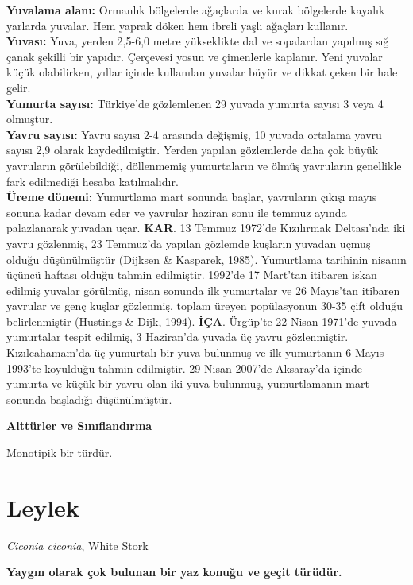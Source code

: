 \documentclass[
  a4paper,
  DIV=11,
  numbers=noendperiod]{scrreprt}
\begin{document}
\textbf{Yuvalama alanı:} Ormanlık bölgelerde ağaçlarda ve kurak
bölgelerde kayalık yarlarda yuvalar. Hem yaprak döken hem ibreli yaşlı
ağaçları kullanır.\\
\textbf{Yuvası:} Yuva, yerden 2,5-6,0 metre yükseklikte dal ve
sopalardan yapılmış sığ çanak şekilli bir yapıdır. Çerçevesi yosun ve
çimenlerle kaplanır. Yeni yuvalar küçük olabilirken, yıllar içinde
kullanılan yuvalar büyür ve dikkat çeken bir hale gelir.\\
\textbf{Yumurta sayısı:} Türkiye'de gözlemlenen 29 yuvada yumurta sayısı
3 veya 4 olmuştur.\\
\textbf{Yavru sayısı:} Yavru sayısı 2-4 arasında değişmiş, 10 yuvada
ortalama yavru sayısı 2,9 olarak kaydedilmiştir. Yerden yapılan
gözlemlerde daha çok büyük yavruların görülebildiği, döllenmemiş
yumurtaların ve ölmüş yavruların genellikle fark edilmediği hesaba
katılmalıdır.\\
\textbf{Üreme dönemi:} Yumurtlama mart sonunda başlar, yavruların çıkışı
mayıs sonuna kadar devam eder ve yavrular haziran sonu ile temmuz ayında
palazlanarak yuvadan uçar. \textbf{KAR}. 13 Temmuz 1972'de Kızılırmak
Deltası'nda iki yavru gözlenmiş, 23 Temmuz'da yapılan gözlemde kuşların
yuvadan uçmuş olduğu düşünülmüştür (Dijksen \& Kasparek, 1985).
Yumurtlama tarihinin nisanın üçüncü haftası olduğu tahmin edilmiştir.
1992'de 17 Mart'tan itibaren iskan edilmiş yuvalar görülmüş, nisan
sonunda ilk yumurtalar ve 26 Mayıs'tan itibaren yavrular ve genç kuşlar
gözlenmiş, toplam üreyen popülasyonun 30-35 çift olduğu belirlenmiştir
(Hustings \& Dijk, 1994). \textbf{İÇA}. Ürgüp'te 22 Nisan 1971'de yuvada
yumurtalar tespit edilmiş, 3 Haziran'da yuvada üç yavru gözlenmiştir.
Kızılcahamam'da üç yumurtalı bir yuva bulunmuş ve ilk yumurtanın 6 Mayıs
1993'te koyulduğu tahmin edilmiştir. 29 Nisan 2007'de Aksaray'da içinde
yumurta ve küçük bir yavru olan iki yuva bulunmuş, yumurtlamanın mart
sonunda başladığı düşünülmüştür.

\textbf{Alttürler ve Sınıflandırma}

Monotipik bir türdür.

\section{Leylek}\label{leylek}

\emph{Ciconia ciconia}, White Stork

\textbf{Yaygın olarak çok bulunan bir yaz konuğu ve geçit türüdür.}
\end{document}
